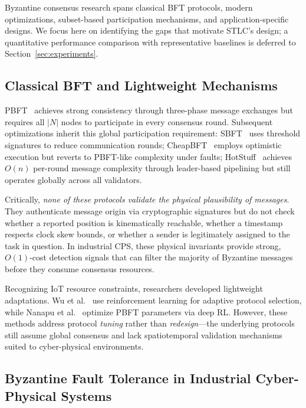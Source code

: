 \documentclass[manuscript,screen,review]{acmart}
\begin{document}
Byzantine consensus research spans classical BFT protocols, modern optimizations, subset-based participation mechanisms, and application-specific designs. We focus here on identifying the gaps that motivate STLC's design; a quantitative performance comparison with representative baselines is deferred to Section~\ref{sec:experiments}.

\subsection{Classical BFT and Lightweight Mechanisms}

PBFT~\cite{habibi2023performance, ye2024tp} achieves strong consistency through three-phase message exchanges but requires all $|N|$ nodes to participate in every consensus round. Subsequent optimizations inherit this global participation requirement: SBFT~\cite{arun2022scalable} uses threshold signatures to reduce communication rounds; CheapBFT~\cite{wang2022bft} employs optimistic execution but reverts to PBFT-like complexity under faults; HotStuff~\cite{wang2024improved} achieves $O(n)$ per-round message complexity through leader-based pipelining but still operates globally across all validators.

Critically, \textit{none of these protocols validate the physical plausibility of messages}. They authenticate message origin via cryptographic signatures but do not check whether a reported position is kinematically reachable, whether a timestamp respects clock skew bounds, or whether a sender is legitimately assigned to the task in question. In industrial CPS, these physical invariants provide strong, $O(1)$-cost detection signals that can filter the majority of Byzantine messages before they consume consensus resources.

Recognizing IoT resource constraints, researchers developed lightweight adaptations. Wu et al.~\cite{wu2023learning} use reinforcement learning for adaptive protocol selection, while Nanapu et al.~\cite{nanapu2025d2bft} optimize PBFT parameters via deep RL. However, these methods address protocol \textit{tuning} rather than \textit{redesign}---the underlying protocols still assume global consensus and lack spatiotemporal validation mechanisms suited to cyber-physical environments.

\subsection{Byzantine Fault Tolerance in Industrial Cyber-Physical Systems}
\end{document}
